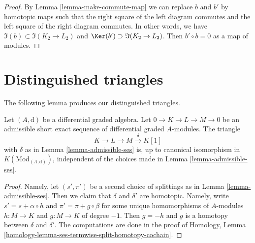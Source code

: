 \begin{proof}
By Lemma \ref{lemma-make-commute-map} we can replace $b$ and $b'$ by
homotopic maps such that the right square of the left diagram commutes
and the left square of the right diagram commutes. In other words, we have
$\Im(b) \subset \Im(K_2 \to L_2)$ and
$\Ker(b') \supset \Im(K_2 \to L_2)$.
Then $b' \circ b = 0$ as a map of modules.
\end{proof}
















\section{Distinguished triangles}
\label{section-distinguished}

\noindent
The following lemma produces our distinguished triangles.

\begin{lemma}
\label{lemma-triangle-independent-splittings}
Let $(A, \text{d})$ be a differential graded algebra. Let
$0 \to K \to L \to M \to 0$ be an admissible short exact sequence
of differential graded $A$-modules. The triangle
\begin{equation}
\label{equation-triangle-associated-to-admissible-ses}
K \to L \to M \xrightarrow{\delta} K[1]
\end{equation}
with $\delta$ as in Lemma \ref{lemma-admissible-ses} is, up to canonical
isomorphism in $K(\text{Mod}_{(A, \text{d})})$, independent of the choices
made in Lemma \ref{lemma-admissible-ses}.
\end{lemma}

\begin{proof}
Namely, let $(s', \pi')$ be a second choice of splittings as in
Lemma \ref{lemma-admissible-ses}. Then we claim that $\delta$ and $\delta'$
are homotopic. Namely, write $s' = s + \alpha \circ h$ and
$\pi' = \pi + g \circ \beta$ for some unique homomorphisms
of $A$-modules $h : M \to K$ and $g : M \to K$ of degree $-1$.
Then $g = -h$ and $g$ is a homotopy between $\delta$ and $\delta'$.
The computations are done in the proof of
Homology, Lemma \ref{homology-lemma-ses-termwise-split-homotopy-cochain}.
\end{proof}

